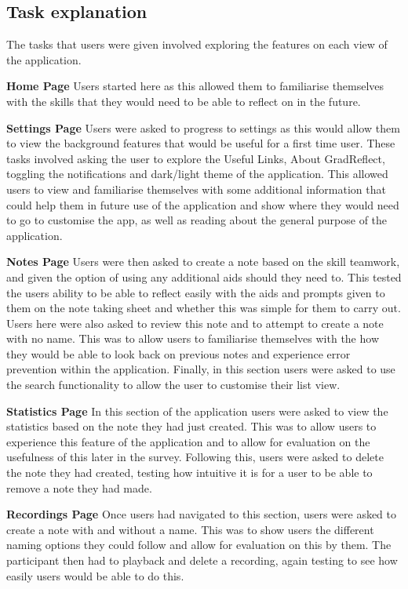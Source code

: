 \documentclass{l4proj}
\begin{document}
\subsection{Task explanation}

The tasks that users were given involved exploring the features on each view of the application.

\textbf{Home Page} Users started here as this allowed them to familiarise themselves with the skills that they would need
to be able to reflect on in the future. 
\par 
\textbf{Settings Page} Users were asked to progress to settings as this would allow them to view the background features that would 
be useful for a first time user. These tasks involved asking the user to explore the Useful Links, About GradReflect, toggling the
notifications and dark/light theme of the application. This allowed users to view and familiarise themselves with some additional 
information that could help them in future use of the application and show where they would need to go to customise the app, as well
as reading about the general purpose of the application.
\par 
\textbf{Notes Page} Users were then asked to create a note based on the skill teamwork, and given the option of using any additional
aids should they need to. This tested the users ability to be able to reflect easily with the aids and prompts given to them on the 
note taking sheet and whether this was simple for them to carry out. Users here were also asked to review this note and to attempt to
create a note with no name. This was to allow users to familiarise themselves with the how they would be able to look back on previous
notes and experience error prevention within the application. Finally, in this section users were asked to use the search functionality
to allow the user to customise their list view.
\par 
\textbf{Statistics Page} In this section of the application users were asked to view the statistics based on the note they had
just created. This was to allow users to experience this feature of the application and to allow for evaluation on the usefulness
of this later in the survey. Following this, users were asked to delete the note they had created, testing how intuitive it is
for a user to be able to remove a note they had made.
\par 
\textbf{Recordings Page} Once users had navigated to this section, users were asked to create a note with and without a name.
This was to show users the different naming options they could follow and allow for evaluation on this by them. The participant
then had to playback and delete a recording, again testing to see how easily users would be able to do this.
\end{document}

